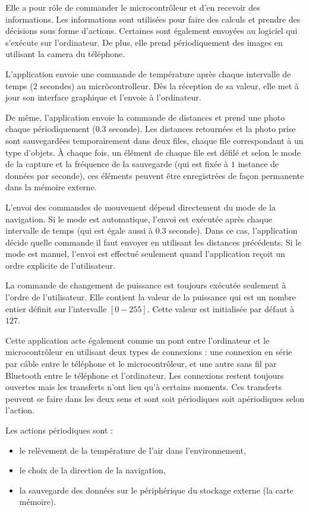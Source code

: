 Elle a pour rôle de commander
le microcontrôleur et d'en recevoir des informations. Les informations
sont utilisées pour faire des calculs et prendre des décisions sous
forme d'actions. Certaines sont également envoyées au logiciel qui s'exécute sur
l'ordinateur. De plus, elle prend périodiquement des images en utilisant la camera
du téléphone.

L'application envoie une commande de température après chaque intervalle de temps
($2$ secondes) au micrôcontrolleur. Dès la réception de sa valeur, elle met à
jour son interface graphique et l'envoie à l'ordinateur.

De même, l'application envoie la commande de distances et prend une photo chaque périodiquement
($0.3$ seconde). Les distances retournées et la photo prise sont sauvegardées
temporairement dans deux files, chaque file correspondant à un type d'objets.
\`A chaque fois, un élément de chaque file est défilé et selon le mode
de la capture et la fréquence de la sauvegarde (qui est fixée à $1$ instance de
données par seconde), ces éléments peuvent être enregistrées de façon permanente
dans la mémoire externe.

L'envoi des commandes de mouvement dépend directement du mode de la navigation.
Si le mode est automatique, l'envoi est exécutée après chaque intervalle de temps
(qui est égale aussi à $0.3$ seconde). Dans ce cas, l'application décide quelle
commande il faut envoyer en utilisant les distances précédents.
Si le mode est manuel, l'envoi est effectué seulement quand l'application reçoit
un ordre explicite de l'utilisateur.

La commande de changement de puissance est toujours exécutée seulement
à l'ordre de l'utilisateur. Elle contient la valeur de la puissance qui
est un nombre entier définit sur l'intervalle $[0-255]$. Cette valeur est initialisée
par défaut à $127$.

Cette application acte également comme un pont entre l'ordinateur et le microcontrôleur
en utilisant deux types de connexions : une connexion en série par câble entre
le téléphone et le microcontrôleur, et une autre sans fil par Bluetooth entre
le téléphone et l'ordinateur. Les connexions restent toujours ouvertes
mais les transferts n'ont lieu qu'à certains moments. Ces transferts peuvent
se faire dans les deux sens et sont soit périodiques soit apériodiques selon l'action.

Les actions périodiques sont :
\begin{itemize}
  \item le relèvement de la température de l'air dans l'environnement,
  \item le choix de la direction de la navigation,
  \item la sauvegarde des données sur le périphérique du stockage externe (la carte mémoire).
\end{itemize}

